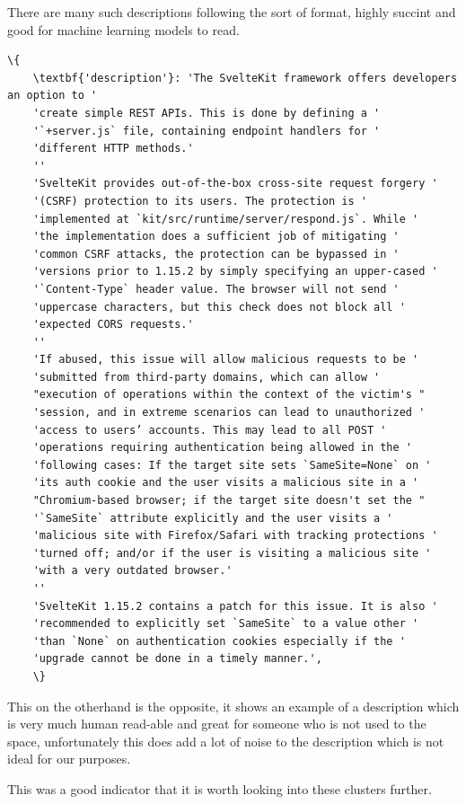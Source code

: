 \documentclass[12pt]{article}
\begin{document}
There are many such descriptions following the sort of format, highly succint and good for machine
learning models to read.

\begin{Verbatim}[breaklines=true, breakanywhere=true, commandchars=\\\{\}]
	\{
	\textbf{'description'}: 'The SvelteKit framework offers developers an option to '
	'create simple REST APIs. This is done by defining a '
	'`+server.js` file, containing endpoint handlers for '
	'different HTTP methods.'
	''
	'SvelteKit provides out-of-the-box cross-site request forgery '
	'(CSRF) protection to its users. The protection is '
	'implemented at `kit/src/runtime/server/respond.js`. While '
	'the implementation does a sufficient job of mitigating '
	'common CSRF attacks, the protection can be bypassed in '
	'versions prior to 1.15.2 by simply specifying an upper-cased '
	'`Content-Type` header value. The browser will not send '
	'uppercase characters, but this check does not block all '
	'expected CORS requests.'
	''
	'If abused, this issue will allow malicious requests to be '
	'submitted from third-party domains, which can allow '
	"execution of operations within the context of the victim's "
	'session, and in extreme scenarios can lead to unauthorized '
	'access to users’ accounts. This may lead to all POST '
	'operations requiring authentication being allowed in the '
	'following cases: If the target site sets `SameSite=None` on '
	'its auth cookie and the user visits a malicious site in a '
	"Chromium-based browser; if the target site doesn't set the "
	'`SameSite` attribute explicitly and the user visits a '
	'malicious site with Firefox/Safari with tracking protections '
	'turned off; and/or if the user is visiting a malicious site '
	'with a very outdated browser.'
	''
	'SvelteKit 1.15.2 contains a patch for this issue. It is also '
	'recommended to explicitly set `SameSite` to a value other '
	'than `None` on authentication cookies especially if the '
	'upgrade cannot be done in a timely manner.',
	\}
\end{Verbatim}

This on the otherhand is the opposite, it shows an example of a description which is very much human
read-able and great for someone who is not used to the space, unfortunately this does add a lot of
noise to the description which is not ideal for our purposes.

This was a good indicator that it is worth looking into these clusters further.
\end{document}
